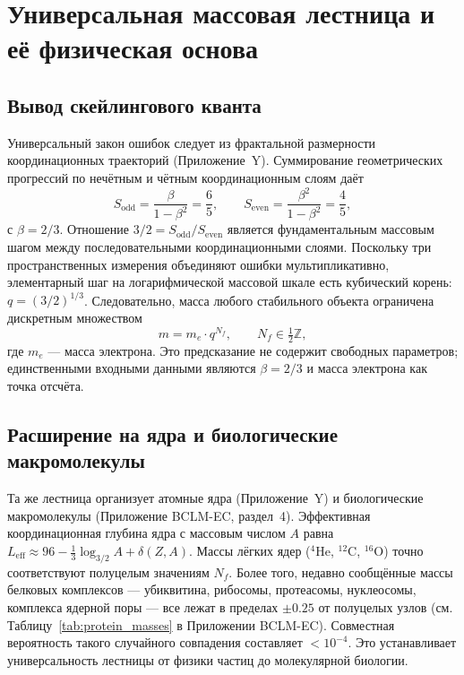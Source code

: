 \documentclass[11pt,a4paper]{article}
\begin{document}
	\section{Универсальная массовая лестница и её физическая основа}
	
	\subsection{Вывод скейлингового кванта}
	
	Универсальный закон ошибок следует из фрактальной размерности координационных траекторий (Приложение~Y). Суммирование геометрических прогрессий по нечётным и чётным координационным слоям даёт
	\[
	S_{\mathrm{odd}} = \frac{\beta}{1-\beta^2} = \frac{6}{5}, \qquad
	S_{\mathrm{even}} = \frac{\beta^2}{1-\beta^2} = \frac{4}{5},
	\]
	с \(\beta = 2/3\). Отношение \(3/2 = S_{\mathrm{odd}}/S_{\mathrm{even}}\) является фундаментальным массовым шагом между последовательными координационными слоями. Поскольку три пространственных измерения объединяют ошибки мультипликативно, элементарный шаг на логарифмической массовой шкале есть кубический корень: \(q = (3/2)^{1/3}\). Следовательно, масса любого стабильного объекта ограничена дискретным множеством
	\begin{equation}
		m = m_e \cdot q^{N_f}, \qquad N_f \in \tfrac12\mathbb{Z},
		\label{eq:quantization}
	\end{equation}
	где \(m_e\) — масса электрона. Это предсказание не содержит свободных параметров; единственными входными данными являются \(\beta = 2/3\) и масса электрона как точка отсчёта.
	
	\subsection{Расширение на ядра и биологические макромолекулы}
	
	Та же лестница организует атомные ядра (Приложение~Y) и биологические макромолекулы (Приложение BCLM-EC, раздел~4). Эффективная координационная глубина ядра с массовым числом \(A\) равна \(L_{\mathrm{eff}} \approx 96 - \frac13 \log_{3/2} A + \delta(Z,A)\). Массы лёгких ядер (\(^4\)He, \(^{12}\)C, \(^{16}\)O) точно соответствуют полуцелым значениям \(N_f\). Более того, недавно сообщённые массы белковых комплексов — убиквитина, рибосомы, протеасомы, нуклеосомы, комплекса ядерной поры — все лежат в пределах \(\pm 0.25\) от полуцелых узлов (см. Таблицу~\ref{tab:protein_masses} в Приложении BCLM-EC). Совместная вероятность такого случайного совпадения составляет \(< 10^{-4}\). Это устанавливает универсальность лестницы от физики частиц до молекулярной биологии.
	
\end{document}
